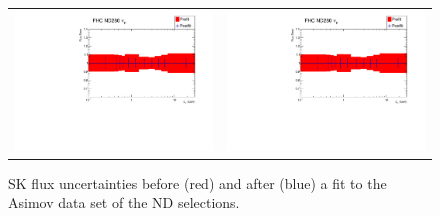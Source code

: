 \begin{figure}[ht]
\begin{center}
\begin{adjustbox}{center}
\begin{tabular}{cc}
        \includegraphics[width=\imagewidth\textwidth,page=15]{images/BANFF/flux_asimov.pdf} & \includegraphics[width=\imagewidth\textwidth,page=16]{images/BANFF/flux_asimov.pdf}\\
      \end{tabular}
    \end{adjustbox}
    \caption[SK flux uncertainties before and after a fit to the
    Asimov data set of the ND280 selections]{\Gls{SK} flux
      uncertainties before (red) and after (blue) a fit to the
      \Gls{Asimov} data set of the \Gls{ND} selections.}
    \label{fig:asimovfluxSK}
  \end{center}
\end{figure}


